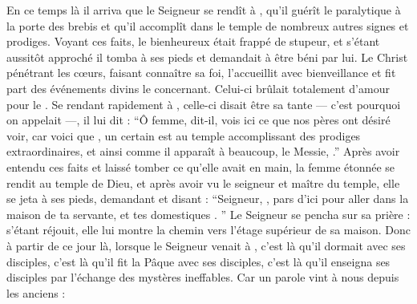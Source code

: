 En ce temps là il arriva que le Seigneur se rendît à , qu'il guérît le paralytique à la porte des brebis  et qu'il accomplît dans le temple de nombreux autres signes et prodiges.   %
Voyant ces faits, le bienheureux était frappé de stupeur, et s'étant aussitôt approché il tomba à ses pieds et demandait à être béni par lui. 
Le Christ  pénétrant les cœurs, faisant connaître sa foi, l'accueillit avec bienveillance et   fit part des événements divins le concernant. 
Celui-ci brûlait totalement d'amour pour le . 
Se rendant rapidement à 
,
celle-ci disait être sa tante --- c'est pourquoi on appelait  ---,
il  lui dit :
\enquote{Ô femme, dit-il, vois ici ce que nos pères ont désiré voir,
car voici que , un certain  est au temple accomplissant des prodiges extraordinaires, et ainsi comme il apparaît à beaucoup,  le Messie, .}
Après avoir entendu ces faits  et laissé tomber ce qu'elle avait en main, la femme étonnée se rendit au temple de Dieu, et après avoir vu le seigneur et maître du temple, elle se jeta à ses pieds, demandant et disant :
\enquote{Seigneur, , pars d'ici pour aller dans la maison de ta servante,
et   tes domestiques .
}
Le Seigneur se pencha sur sa prière : 
s'étant réjouit, elle lui montre la chemin vers l'étage supérieur de sa maison.
Donc à partir de ce jour là, lorsque le Seigneur venait à , 
c'est là qu'il dormait avec ses disciples, 
c'est là qu'il fit la Pâque avec ses disciples,
c'est là qu'il enseigna ses disciples par l'échange des mystères ineffables.
Car un parole vint à nous depuis les anciens :
